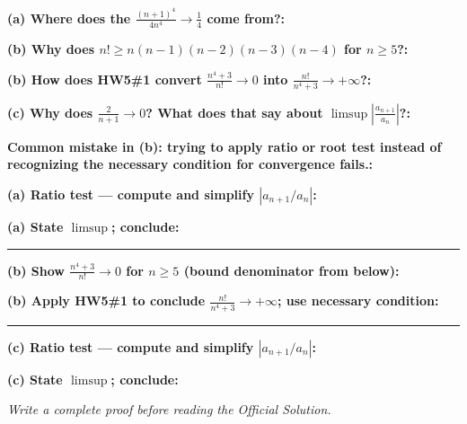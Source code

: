\documentclass[12pt]{article}
\newcommand{\fillfield}[1]{%
  \par\noindent\textbf{#1:}\enspace\hrulefill\par\vspace{3pt}%
}
\newcommand{\writespace}[1]{\vspace{#1}}
\begin{document}
\bigskip

\begin{tcolorbox}[
  enhanced, breakable,
  colback  = pass3orange,
  colframe = orange!65!black,
  fonttitle = \bfseries,
  title = {Pass 3 \enspace\textbf{--}\enspace Self-Explanation}
]
\fillfield{(a) Where does the $\frac{(n+1)^4}{4n^4} \to \frac{1}{4}$ come from?}
\fillfield{(b) Why does $n! \geq n(n-1)(n-2)(n-3)(n-4)$ for $n \geq 5$?}
\fillfield{(b) How does HW5\#1 convert $\frac{n^4+3}{n!} \to 0$ into $\frac{n!}{n^4+3} \to +\infty$?}
\fillfield{(c) Why does $\frac{2}{n+1} \to 0$? What does that say about $\limsup\left|\frac{a_{n+1}}{a_n}\right|$?}
\fillfield{Common mistake in (b): trying to apply ratio or root test instead of recognizing the necessary condition for convergence fails.}
\end{tcolorbox}

\newpage

\begin{tcolorbox}[
  enhanced, breakable,
  colback  = pass4purple,
  colframe = purple!55!black,
  fonttitle = \bfseries,
  title = {Pass 4 \enspace\textbf{--}\enspace Skeleton Proof}
]
\noindent\textbf{(a) Ratio test — compute and simplify $|a_{n+1}/a_n|$:}\par
\writespace{1.4cm}
\noindent\textbf{(a) State $\limsup$; conclude:}\par
\writespace{0.8cm}

\noindent\rule{\linewidth}{0.4pt}\vspace{2pt}

\noindent\textbf{(b) Show $\frac{n^4+3}{n!} \to 0$ for $n \geq 5$ (bound denominator from below):}\par
\writespace{1.8cm}
\noindent\textbf{(b) Apply HW5\#1 to conclude $\frac{n!}{n^4+3} \to +\infty$; use necessary condition:}\par
\writespace{1.2cm}

\noindent\rule{\linewidth}{0.4pt}\vspace{2pt}

\noindent\textbf{(c) Ratio test — compute and simplify $|a_{n+1}/a_n|$:}\par
\writespace{1.4cm}
\noindent\textbf{(c) State $\limsup$; conclude:}\par
\writespace{0.8cm}
\end{tcolorbox}

\newpage

\begin{tcolorbox}[
  enhanced, breakable,
  colback  = pass5gray,
  colframe = black!38,
  fonttitle = \bfseries,
  title = {Pass 5 \enspace\textbf{--}\enspace Full Proof Attempt}
]
\small\itshape Write a complete proof before reading the Official Solution.\par
\normalfont\normalsize
\writespace{19cm}
\end{tcolorbox}
\end{document}
